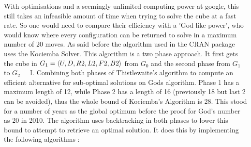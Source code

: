 \documentclass{article}
\DeclarePairedDelimiter{\opair}{\langle}{\rangle}
\newcounter{lem}[section]\setcounter{lem}{0}
\begin{document}
With optimisations and a seemingly unlimited computing power at google, this still takes an infeasible amount of time when trying to solve the cube at a fast rate. So one would need to compare their efficiency with a 'God like power', who would know where every configuration can be returned to solve in a maximum number of 20 moves. As said before the algorithm used in the CRAN package uses the Kociemba Solver. This algorithm is a two phase approach. It first gets the cube in  $G_1 = \opair{U,D,R2,L2,F2,B2}$ from  $G_0$ and the second phase from $G_1$ to $G_2$ = I.  Combining both phases of Thistlewaite's algorithm to compute an efficient alternative for sub-optimal solutions on Gods algorithm. Phase 1 has a maximum length of 12, while Phase 2 has a length of 16 (previously 18 but last 2 can be avoided), thus the whole bound of Kociemba's Algorithm is 28. This stood for a number of years as the global optimum before the proof for God's number as 20 in 2010\cite{Rokicki2013TheDO}. The algorithm uses backtracking in both phases to lower this bound to attempt to retrieve an optimal solution. It does this by implementing the following algorithms\cite{kocweb} :
\end{document}
